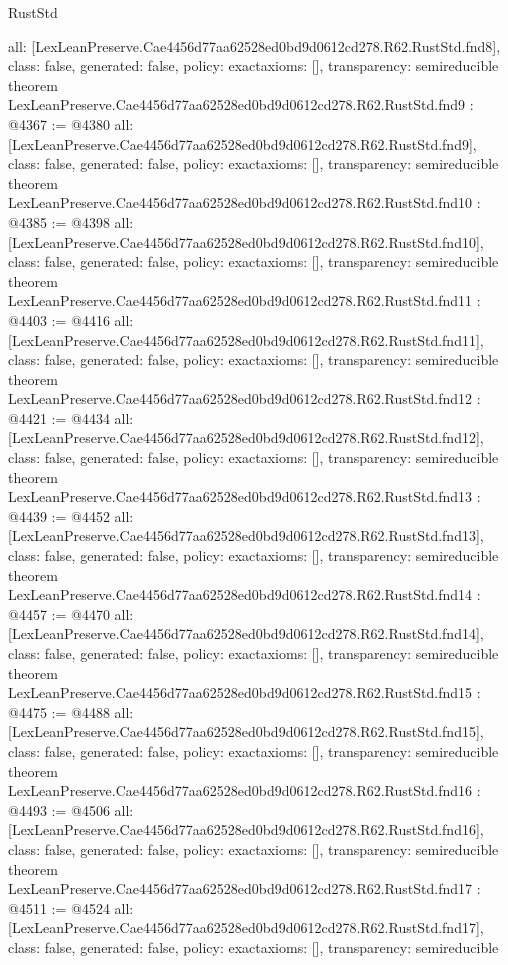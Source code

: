 \begin{lexlean}{RustStd}
\begin{coremodule}
{  all: [LexLeanPreserve.Cae4456d77aa62528ed0bd9d0612cd278.R62.RustStd.fnd8],
  class: false,
  generated: false,
  policy: exact{axioms: []},
  transparency: semireducible
}
theorem LexLeanPreserve.Cae4456d77aa62528ed0bd9d0612cd278.R62.RustStd.fnd9 : @4367 := @4380 {
  all: [LexLeanPreserve.Cae4456d77aa62528ed0bd9d0612cd278.R62.RustStd.fnd9],
  class: false,
  generated: false,
  policy: exact{axioms: []},
  transparency: semireducible
}
theorem LexLeanPreserve.Cae4456d77aa62528ed0bd9d0612cd278.R62.RustStd.fnd10 : @4385 := @4398 {
  all: [LexLeanPreserve.Cae4456d77aa62528ed0bd9d0612cd278.R62.RustStd.fnd10],
  class: false,
  generated: false,
  policy: exact{axioms: []},
  transparency: semireducible
}
theorem LexLeanPreserve.Cae4456d77aa62528ed0bd9d0612cd278.R62.RustStd.fnd11 : @4403 := @4416 {
  all: [LexLeanPreserve.Cae4456d77aa62528ed0bd9d0612cd278.R62.RustStd.fnd11],
  class: false,
  generated: false,
  policy: exact{axioms: []},
  transparency: semireducible
}
theorem LexLeanPreserve.Cae4456d77aa62528ed0bd9d0612cd278.R62.RustStd.fnd12 : @4421 := @4434 {
  all: [LexLeanPreserve.Cae4456d77aa62528ed0bd9d0612cd278.R62.RustStd.fnd12],
  class: false,
  generated: false,
  policy: exact{axioms: []},
  transparency: semireducible
}
theorem LexLeanPreserve.Cae4456d77aa62528ed0bd9d0612cd278.R62.RustStd.fnd13 : @4439 := @4452 {
  all: [LexLeanPreserve.Cae4456d77aa62528ed0bd9d0612cd278.R62.RustStd.fnd13],
  class: false,
  generated: false,
  policy: exact{axioms: []},
  transparency: semireducible
}
theorem LexLeanPreserve.Cae4456d77aa62528ed0bd9d0612cd278.R62.RustStd.fnd14 : @4457 := @4470 {
  all: [LexLeanPreserve.Cae4456d77aa62528ed0bd9d0612cd278.R62.RustStd.fnd14],
  class: false,
  generated: false,
  policy: exact{axioms: []},
  transparency: semireducible
}
theorem LexLeanPreserve.Cae4456d77aa62528ed0bd9d0612cd278.R62.RustStd.fnd15 : @4475 := @4488 {
  all: [LexLeanPreserve.Cae4456d77aa62528ed0bd9d0612cd278.R62.RustStd.fnd15],
  class: false,
  generated: false,
  policy: exact{axioms: []},
  transparency: semireducible
}
theorem LexLeanPreserve.Cae4456d77aa62528ed0bd9d0612cd278.R62.RustStd.fnd16 : @4493 := @4506 {
  all: [LexLeanPreserve.Cae4456d77aa62528ed0bd9d0612cd278.R62.RustStd.fnd16],
  class: false,
  generated: false,
  policy: exact{axioms: []},
  transparency: semireducible
}
theorem LexLeanPreserve.Cae4456d77aa62528ed0bd9d0612cd278.R62.RustStd.fnd17 : @4511 := @4524 {
  all: [LexLeanPreserve.Cae4456d77aa62528ed0bd9d0612cd278.R62.RustStd.fnd17],
  class: false,
  generated: false,
  policy: exact{axioms: []},
  transparency: semireducible
}
\end{coremodule}
\end{lexlean}
